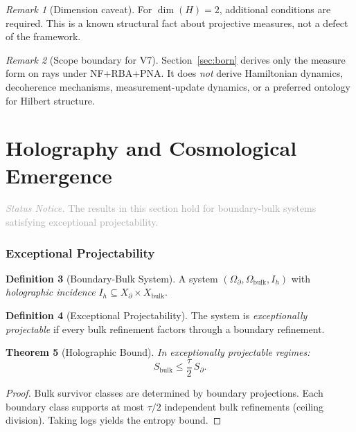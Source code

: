 \documentclass[11pt,a4paper]{article}
\newtheorem{theorem}{Theorem}[section]
\theoremstyle{definition}
\newtheorem{definition}[theorem]{Definition}
\theoremstyle{remark}
\newtheorem{remark}[theorem]{Remark}
\newcommand{\statusnotice}[1]{%
  \medskip\noindent\textcolor{darkgray}{\textit{Status Notice.} #1}\medskip
}
\begin{document}
\begin{remark}[Dimension caveat]
For $\dim(H) = 2$, additional conditions are required. This is a known structural fact about projective measures, not a defect of the framework.
\end{remark}

\begin{remark}[Scope boundary for V7]
Section~\ref{sec:born} derives only the measure form on rays under NF+RBA+PNA. It does \emph{not} derive Hamiltonian dynamics, decoherence mechanisms, measurement-update dynamics, or a preferred ontology for Hilbert structure.
\end{remark}


\part{Holography and Cosmological Emergence}

\statusnotice{The results in this section hold for boundary-bulk systems satisfying exceptional projectability.}

\section{Exceptional Projectability}

\begin{definition}[Boundary-Bulk System]\label{def:bulk}
A system $(\Omega_\partial, \Omega_{\mathrm{bulk}}, I_h)$ with \emph{holographic incidence} $I_h \subseteq X_\partial \times X_{\mathrm{bulk}}$.
\end{definition}

\begin{definition}[Exceptional Projectability]\label{def:except}
The system is \emph{exceptionally projectable} if every bulk refinement factors through a boundary refinement.
\end{definition}

\begin{theorem}[Holographic Bound]\label{thm:holo}
In exceptionally projectable regimes:
\[
  S_{\mathrm{bulk}} \leq \frac{\tau}{2}\, S_\partial.
\]
\end{theorem}
\begin{proof}
Bulk survivor classes are determined by boundary projections. Each boundary class supports at most $\tau/2$ independent bulk refinements (ceiling division). Taking logs yields the entropy bound.
\end{proof}
\end{document}
